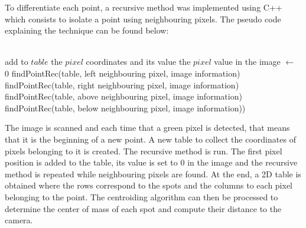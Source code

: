 To differentiate each point, a recursive method was implemented using C++ which consists to isolate a point using neighbouring pixels. The pseudo code explaining the technique can be found below:

\begin{algorithmic}
\\
    			\State add to $table$ the $pixel$ coordinates and its value
    			\State the $pixel$ value in the image $\gets$ 0
			\State findPointRec(table, left neighbouring pixel, image information)
			\State findPointRec(table, right neighbouring pixel, image information)
			\State findPointRec(table, above neighbouring pixel, image information)
			\State findPointRec(table, below neighbouring pixel, image information))
		\EndIf
\EndFunction
\end{algorithmic}

The image is scanned and each time that a green pixel is detected, that means that it is the beginning of a new point. A new table to collect the coordinates of pixels belonging to it is created. The recursive method is run. The first pixel position is added to the table, its value is set to 0 in the image and the recursive method is repeated while neighbouring pixels are found. At the end, a 2D table is obtained where the rows correspond to the spots and the columns to each pixel belonging to the point. The centroiding algorithm can then be processed to determine the center of mass of each spot and compute their distance to the camera. 